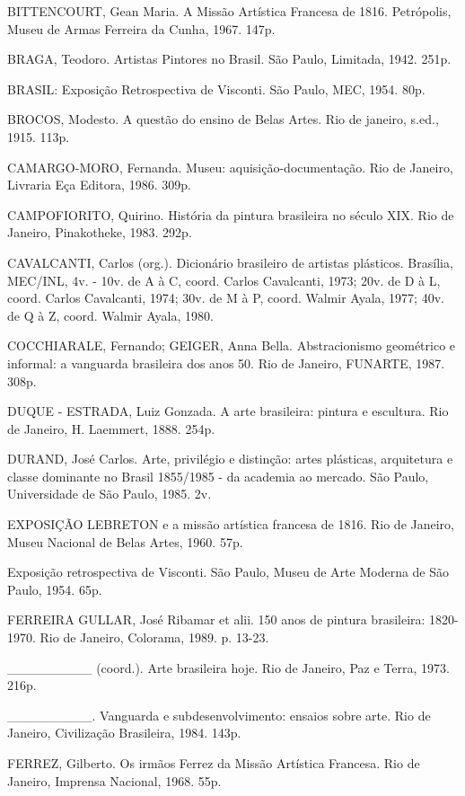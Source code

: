 BITTENCOURT, Gean Maria. A Missão Artística Francesa de 1816. Petrópolis, Museu de Armas Ferreira da Cunha, 1967. 147p.

BRAGA, Teodoro. Artistas Pintores no Brasil. São Paulo, Limitada, 1942. 251p.

BRASIL: Exposição Retrospectiva de Visconti. São Paulo, MEC, 1954. 80p.

BROCOS, Modesto. A questão do ensino de Belas Artes. Rio de janeiro, s.ed., 1915. 113p.

CAMARGO-MORO, Fernanda. Museu: aquisição-documentação. Rio de Janeiro, Livraria Eça Editora, 1986. 309p.

CAMPOFIORITO, Quirino. História da pintura brasileira no século XIX. Rio de Janeiro, Pinakotheke, 1983. 292p.

CAVALCANTI, Carlos (org.). Dicionário brasileiro de artistas plásticos. Brasília, MEC/INL, 4v. - 10v. de A à C, coord. Carlos Cavalcanti, 1973; 20v. de D à L, coord. Carlos Cavalcanti, 1974; 30v. de M à P, coord. Walmir Ayala, 1977; 40v. de Q à Z, coord. Walmir Ayala, 1980.

COCCHIARALE, Fernando; GEIGER, Anna Bella. Abstracionismo geométrico e informal: a vanguarda brasileira dos anos 50. Rio de Janeiro, FUNARTE, 1987. 308p.

DUQUE - ESTRADA, Luiz Gonzada. A arte brasileira: pintura e escultura. Rio de Janeiro, H. Laemmert, 1888. 254p.

DURAND, José Carlos. Arte, privilégio e distinção: artes plásticas, arquitetura e classe dominante no Brasil 1855/1985 - da academia ao mercado. São Paulo, Universidade de São Paulo, 1985. 2v.

EXPOSIÇÃO LEBRETON e a missão artística francesa de 1816. Rio de Janeiro, Museu Nacional de Belas Artes, 1960. 57p.

Exposição retrospectiva de Visconti. São Paulo, Museu de Arte Moderna de São Paulo, 1954. 65p.

FERREIRA GULLAR, José Ribamar et alii. 150 anos de pintura brasileira: 1820-1970. Rio de Janeiro, Colorama, 1989. p. 13-23.

\_\_\_\_\_\_\_\_\_ (coord.). Arte brasileira hoje. Rio de Janeiro, Paz e Terra, 1973. 216p.

\_\_\_\_\_\_\_\_\_. Vanguarda e subdesenvolvimento: ensaios sobre arte. Rio de Janeiro, Civilização Brasileira, 1984. 143p.

FERREZ, Gilberto. Os irmãos Ferrez da Missão Artística Francesa. Rio de Janeiro, Imprensa Nacional, 1968. 55p.


